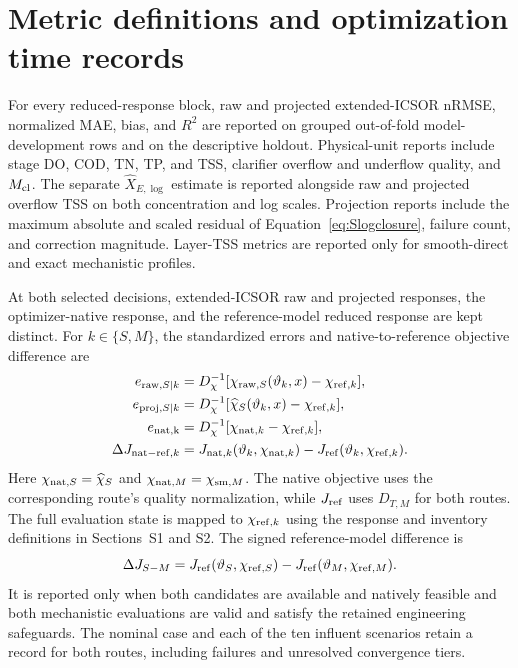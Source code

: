 \documentclass[a4paper,fleqn]{cas-sc}
\begin{document}
\section{Metric definitions and optimization time records}

For every reduced-response block, raw and projected extended-ICSOR nRMSE, normalized MAE, bias, and $R^2$ are reported on grouped out-of-fold model-development rows and on the descriptive holdout. Physical-unit reports include stage DO, COD, TN, TP, and TSS, clarifier overflow and underflow quality, and $M_{\rm cl}$. The separate $\widehat X_{E,\log}$ estimate is reported alongside raw and projected overflow TSS on both concentration and log scales. Projection reports include the maximum absolute and scaled residual of Equation~\eqref{eq:Slogclosure}, failure count, and correction magnitude. Layer-TSS metrics are reported only for smooth-direct and exact mechanistic profiles.

At both selected decisions, extended-ICSOR raw and projected responses, the optimizer-native response, and the reference-model reduced response are kept distinct. For $k\in\{S,M\}$, the standardized errors and native-to-reference objective difference are
\begin{align}
e_{{\rm raw},S|k}&=D_\chi^{-1}[\chi_{{\rm raw},S}(\vartheta_k,x)-\chi_{{\rm ref},k}],\notag\\
e_{{\rm proj},S|k}&=D_\chi^{-1}[\widehat\chi_S(\vartheta_k,x)-\chi_{{\rm ref},k}],\notag\\
e_{\rm nat,k}&=D_\chi^{-1}[\chi_{{\rm nat},k}-\chi_{{\rm ref},k}],\notag\\
\Delta J_{{\rm nat-ref},k}&=J_{{\rm nat},k}(\vartheta_k,\chi_{{\rm nat},k})-J_{\rm ref}(\vartheta_k,\chi_{{\rm ref},k}).
\label{eq:Serrors}
\end{align}
Here $\chi_{{\rm nat},S}=\widehat\chi_S$ and $\chi_{{\rm nat},M}=\chi_{{\rm sm},M}$. The native objective uses the corresponding route's quality normalization, while $J_{\rm ref}$ uses $D_{T,M}$ for both routes. The full evaluation state is mapped to $\chi_{{\rm ref},k}$ using the response and inventory definitions in Sections~S1 and S2. The signed reference-model difference is
\begin{equation}
\Delta J_{S-M}=J_{\rm ref}(\vartheta_S,\chi_{{\rm ref},S})-J_{\rm ref}(\vartheta_M,\chi_{{\rm ref},M}).
\end{equation}
It is reported only when both candidates are available and natively feasible and both mechanistic evaluations are valid and satisfy the retained engineering safeguards. The nominal case and each of the ten influent scenarios retain a record for both routes, including failures and unresolved convergence tiers.
\end{document}
